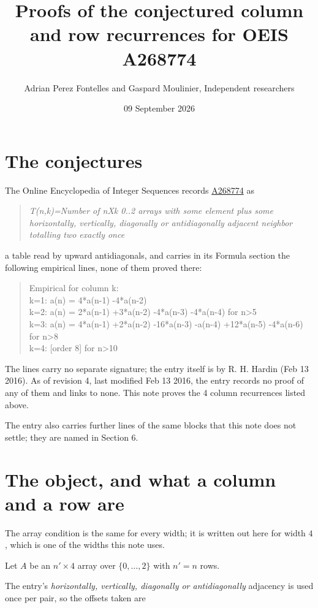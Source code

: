 \documentclass[11pt]{article}
\title{Proofs of the conjectured column and row recurrences for OEIS A268774}
\author{Adrian Perez Fontelles and Gaspard Moulinier, Independent researchers}
\date{09 September 2026}
\theoremstyle{definition}
\begin{document}
\maketitle
\section{The conjectures}

The Online Encyclopedia of Integer Sequences records \href{https://oeis.org/A268774}{A268774} as

\begin{quote}\itshape T(n,k)=Number of nXk 0..2 arrays with some element plus some horizontally, vertically, diagonally or antidiagonally adjacent neighbor totalling two exactly once\end{quote}

a table read by upward antidiagonals, and carries in its Formula section the following empirical lines, none of them proved there:

\begin{quote}\ttfamily Empirical for column k:\\
k=1: a(n) = 4*a(n-1) -4*a(n-2)\\k=2: a(n) = 2*a(n-1) +3*a(n-2) -4*a(n-3) -4*a(n-4) for n>5\\k=3: a(n) = 4*a(n-1) +2*a(n-2) -16*a(n-3) -a(n-4) +12*a(n-5) -4*a(n-6) for n>8\\k=4: [order 8] for n>10\end{quote}

The lines carry no separate signature; the entry itself is by R. H. Hardin (Feb 13 2016). As of revision 4, last modified Feb 13 2016, the entry records no proof of any of them and links to none. This note proves the 4 column recurrences listed above.

The entry also carries further lines of the same blocks that this note does not settle; they are named in Section 6.

\section{The object, and what a column and a row are}

The array condition is the same for every width; it is written out here for width $4$, which is one of the widths this note uses.

Let $A$ be an $n' \times 4$ array over $\{0,\dots,2\}$ with $n' = n$ rows.

The entry's {\itshape horizontally, vertically, diagonally or antidiagonally} adjacency is used once per pair, so the offsets taken are
\end{document}

